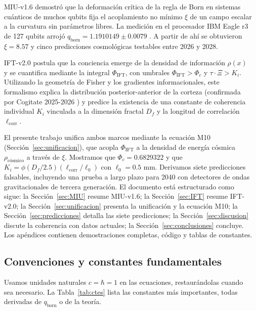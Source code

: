 \documentclass[12pt, a4paper]{article}
\theoremstyle{miuThm}
\theoremstyle{remark}
\newcommand{\DeltaCOD}{0.6829322}
\begin{document}
MIU-v1.6 \cite{MIU2025} demostró que la deformación crítica de la regla de Born en sistemas cuánticos de muchos qubits fija el acoplamiento no mínimo $\xi$ de un campo escalar a la curvatura sin parámetros libres. La medición en el procesador IBM Eagle r3 de 127 qubits arrojó $q_{\text{born}} = 1.1910149\pm0.0079$ \cite{IBM2025,IBM2026}. A partir de ahí se obtuvieron $\xi = 8.57$ y cinco predicciones cosmológicas testables entre 2026 y 2028.

IFT-v2.0 \cite{IFT2025} postula que la conciencia emerge de la densidad de información $\rho(x)$ y se cuantifica mediante la integral $\Phi_{\text{IFT}}$, con umbrales $\Phi_{\text{IFT}}>\Phi_c$ y $\tau\cdot\Xi > K_i$. Utilizando la geometría de Fisher y los gradientes informacionales, este formalismo explica la distribución posterior-anterior de la corteza (confirmada por Cogitate 2025-2026 \cite{Cogitate2026}) y predice la existencia de una constante de coherencia individual $K_i$ vinculada a la dimensión fractal $D_f$ y la longitud de correlación $\ell_{\text{corr}}$.

El presente trabajo unifica ambos marcos mediante la ecuación M10 (Sección~\ref{sec:unificacion}), que acopla $\Phi_{\text{IFT}}$ a la densidad de energía cósmica $\rho_{\text{cósmico}}$ a través de $\xi$. Mostramos que $\Phi_c = \DeltaCOD$ y que $K_i = \phi (D_f/2.5)(\ell_{\text{corr}}/\ell_0)$ con $\ell_0 = 0.5$ mm. Derivamos siete predicciones falsables, incluyendo una prueba a largo plazo para 2040 con detectores de ondas gravitacionales de tercera generación. El documento está estructurado como sigue: la Sección~\ref{sec:MIU} resume MIU-v1.6; la Sección~\ref{sec:IFT} resume IFT-v2.0; la Sección~\ref{sec:unificacion} presenta la unificación y la ecuación M10; la Sección~\ref{sec:predicciones} detalla las siete predicciones; la Sección~\ref{sec:discusion} discute la coherencia con datos actuales; la Sección~\ref{sec:conclusiones} concluye. Los apéndices contienen demostraciones completas, código y tablas de constantes.

\subsection{Convenciones y constantes fundamentales}
Usamos unidades naturales $c=\hbar=1$ en las ecuaciones, restaurándolas cuando sea necesario. La Tabla~\ref{tab:ctes} lista las constantes más importantes, todas derivadas de $q_{\text{born}}$ o de la teoría.
\end{document}
